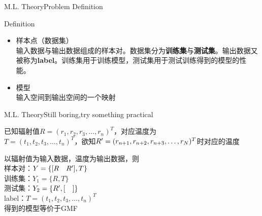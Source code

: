 \documentclass{beamer}
\begin{document}

\begin{frame}{M.L. Theory}{\quad \quad\quad Problem Definition}
 \begin{block}{Definition}
   \begin{itemize}
  \item 样本点（数据集）\\输入数据与输出数据组成的样本对。数据集分为\textbf {训练集}与\textbf{测试集}。输出数据又被称为\textbf {label}。训练集用于训练模型，测试集用于测试训练得到的模型的性能。
  \item 模型\\输入空间到输出空间的一个映射
  \end{itemize}
  \end{block}
  \end{frame}

\begin{frame}[fragile]{M.L. Theory}{\quad \quad\quad Still boring,try something practical}
\begin{block}{}
已知辐射值$R=( r_1,r_2,r_3,\ldots , r_n )^T$，对应温度为\\
$T=(t_1,t_2,t_3,\ldots , t_n )^T$，欲知$R\rq{}=( r_{n+1},r_{n+2},r_{n+3},\ldots , r_N )^T$时对应的温度\\
\end{block}
以辐射值为输入数据，温度为输出数据，则\\样本对：$Y=\{[R \quad R\rq{}],T\}$ \\ 训练集：$Y_1=\{R,T\}$ \\ 测试集：$Y_2=\{R\rq{},[ \quad ]\}$\\label：$T=(t_1,t_2,t_3,\ldots , t_n )^T$\\
得到的模型等价于GMF

\end{frame}
\end{document}
